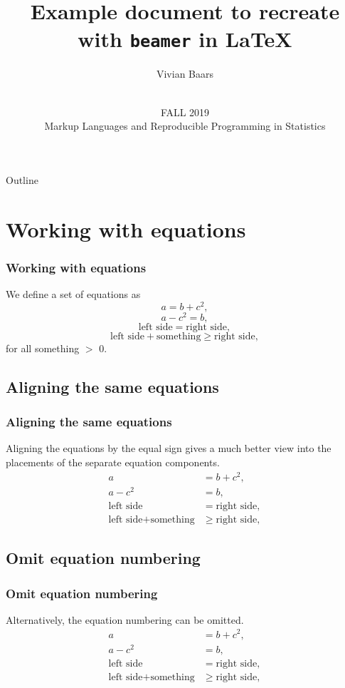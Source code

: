 \documentclass[aspectratio=169]{beamer}
\title[Example document]
{Example document to recreate with \texttt{beamer} in \LaTeX}
\author[Vivian Baars]
{Vivian Baars}
\date[October 2020]{\vspace{.5 in}\\ FALL 2019 \\ Markup Languages and Reproducible Programming in Statistics  \vskip6mm}
\begin{document}
\titlepage

\begin{frame}{Outline}
\tableofcontents
\end{frame}

\section{Working with equations}
\begin{frame}
\frametitle{Working with equations}

We define a set of equations as
\begin{equation}
a = b + c^2,
\end{equation}
\begin{equation}
a - c^2 = b,
\end{equation}
\begin{equation}
\text{left side} = \text{right side},
\end{equation}
\begin{equation}
\text{left side} + \text{something} \ge \text{right side},
\end{equation}
for all something $>$ 0.

\end{frame}

\subsection{Aligning the same equations}
\begin{frame}
\frametitle{Aligning the same equations}

Aligning the equations by the equal sign gives a much better view into the placements of the separate equation components.
\begin{align}
a& = b + c^2, \\
a - c^2& = b, \\
\text{left side}& = \text{right side}, \\
\text{left side} + \text{something}& \ge \text{right side},
\end{align}

\end{frame}

\subsection{Omit equation numbering}
\begin{frame}
\frametitle{Omit equation numbering}

Alternatively, the equation numbering can be omitted.
\begin{align*}
a& = b + c^2, \\
a - c^2& = b, \\
\text{left side}& = \text{right side}, \\
\text{left side} + \text{something}& \ge \text{right side},
\end{align*}

\end{frame}
\end{document}
